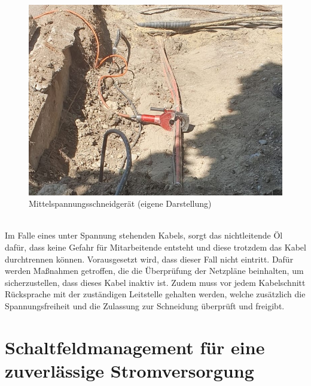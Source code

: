 \begin{figure}[hbt]
    \centering
    \includegraphics[width=0.98\linewidth]{images/MS_Kabelschnitt.jpeg}
    \caption[MS Schneidung]{Mittelspannungsschneidgerät (eigene Darstellung)}
    \label{fig:MS Schneidgerät}
\end{figure}
\\Im Falle eines unter Spannung stehenden Kabels, sorgt das nichtleitende Öl dafür, dass keine Gefahr für Mitarbeitende entsteht und diese trotzdem das Kabel 
durchtrennen können. Vorausgesetzt wird, dass dieser Fall nicht eintritt. Dafür werden Maßnahmen getroffen, die die Überprüfung der Netzpläne beinhalten, 
um sicherzustellen, dass dieses Kabel inaktiv ist. Zudem muss vor jedem Kabelschnitt Rücksprache mit der zuständigen Leitstelle gehalten werden, welche 
zusätzlich die Spannungsfreiheit und die Zulassung zur Schneidung überprüft und freigibt.  
\clearpage

\section{Schaltfeldmanagement für eine zuverlässige Stromversorgung}

